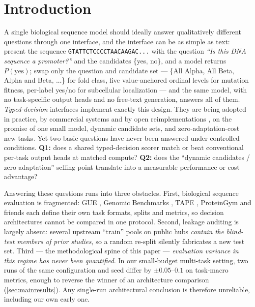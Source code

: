 \section{Introduction}
\label{sec:intro}

A single biological sequence model should ideally answer qualitatively different questions
through one interface, and the interface can be as simple as text: present the sequence
\texttt{GTATTCTCCCCTAACAAGAC...} with the question \emph{``Is this DNA sequence a
promoter?''} and the candidates \{yes, no\}, and a model returns $P(\text{yes})$; swap only
the question and candidate set --- \{All Alpha, All Beta, Alpha and Beta, ...\} for fold
class, five value-anchored ordinal levels for mutation fitness, per-label yes/no for
subcellular localization --- and the same model, with no task-specific output heads and no
free-text generation, answers all of them. \emph{Typed-decision} interfaces implement
exactly this design. They are being adopted in
practice, by commercial systems \citep{almeida2026jev} and by open reimplementations
\citep{gliclass2025,nanojev2026,semif2025}, on the promise of one small model, dynamic
candidate sets, and zero-adaptation-cost new tasks. Yet two basic questions have never been
answered under controlled conditions. \textbf{Q1:} does a shared typed-decision scorer match
or beat conventional per-task output heads at matched compute? \textbf{Q2:} does the
``dynamic candidates / zero adaptation'' selling point translate into a measurable
performance or cost advantage?

Answering these questions runs into three obstacles. First, biological sequence evaluation
is fragmented: GUE \citep{zhou2024dnabert}, Genomic Benchmarks
\citep{gresova2022genomic}, TAPE \citep{rao2019tape}, ProteinGym \citep{notin2023proteingym}
and friends each define their own task formats, splits and metrics, so decision architectures
cannot be compared in one protocol. Second, leakage auditing is largely absent: several
upstream ``train'' pools on public hubs \emph{contain the blind-test members of prior
studies}, so a random re-split silently fabricates a new test set. Third --- the
methodological spine of this paper --- \emph{evaluation variance in this regime has never
been quantified}. In our small-budget multi-task setting, two runs of the same configuration
and seed differ by $\pm0.05$--$0.1$ on task-macro metrics, enough to reverse the winner of
an architecture comparison (\cref{sec:mainresults}). Any single-run architectural conclusion
is therefore unreliable, including our own early one.

